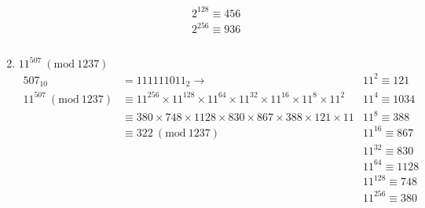 \documentclass{article}
\newcommand{\Mod}[1]{\ (\mathrm{mod}\ #1)}
\begin{document}
\begin{enumerate}[label=(\alph*)]
\begin{align*}
                                 &                                                                                 & 2^{128} \equiv 456 \\
                                 &                                                                                 & 2^{256} \equiv 936 \\
                                 &                                                                                 &                    \\
                                 &                                                                                 &
          \end{align*}
    \item \(11^{507} \Mod{1237}\)
          \begin{align*}
              507_{10}            & = 111111011_2 \rightarrow                                                                            & 11^2 \equiv 121     \\
              11^{507} \Mod{1237} & \equiv 11^{256} \times 11^{128} \times 11^{64} \times 11^{32} \times 11^{16} \times 11^8 \times 11^2 & 11^4 \equiv 1034    \\
                                  & \equiv 380 \times 748 \times 1128 \times 830 \times 867 \times 388 \times 121  \times 11             & 11^8 \equiv 388     \\
                                  & \equiv 322 \Mod{1237}                                                                                & 11^{16} \equiv 867  \\
                                  &                                                                                                      & 11^{32} \equiv 830  \\
                                  &                                                                                                      & 11^{64} \equiv 1128 \\
                                  &                                                                                                      & 11^{128} \equiv 748 \\
                                  &                                                                                                      & 11^{256} \equiv 380 \\
          \end{align*}
\end{enumerate}
\end{document}
